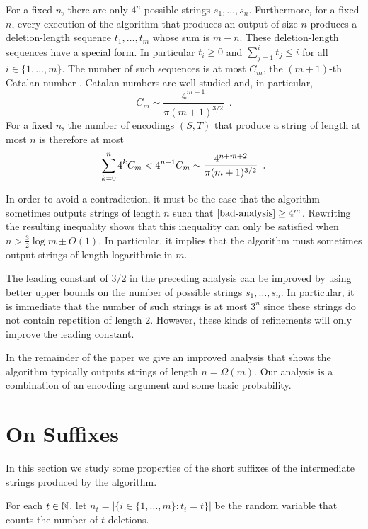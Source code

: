 \documentclass{patmorin}
\begin{document}
For a fixed $n$, there are only $4^n$ possible strings $s_1,\ldots,s_n$.  Furthermore, for a fixed $n$, every execution of the algorithm that produces an output of size $n$ produces a deletion-length sequence $t_1,\ldots,t_m$ whose sum is $m-n$.  These deletion-length sequences have a special form. In particular $t_i\ge 0$ and $\sum_{j=1}^i t_j\le i$ for all $i\in\{1,\ldots,m\}$. The number of such sequences is at most $C_{m}$, the $(m+1)$-th Catalan number \cite{X}.  Catalan numbers are well-studied and, in particular,
\[
     C_m \sim \frac{4^{m+1}}{\pi(m+1)^{3/2}} \enspace .
\]
For a fixed $n$, the number of encodings $(S,T)$ that produce a string of length at most $n$ is therefore at most
\begin{equation}
     \sum_{k=0}^n 4^k C_m < 4^{n+1} C_m \sim \frac{4^{n+m+2}}{\pi(m+1)^{3/2}} \enspace . \eqlabel{bad-analysis}
\end{equation}

In order to avoid a contradiction, it must be the case that the algorithm sometimes outputs strings of length $n$ such that $\eqref{bad-analysis} \ge 4^m$.  Rewriting the resulting inequality shows that this inequality can only be satisfied when $n > \tfrac{3}{2}\log m \pm O(1)$.  In particular, it implies that the algorithm must sometimes output strings of length logarithmic in $m$.

The leading constant of $3/2$ in the preceding analysis can be improved by using better upper bounds on the number of possible strings $s_1,\ldots,s_n$. In particular, it is immediate that the number of such strings is at most $3^{n}$ since these strings do not contain repetition of length 2.  However, these kinds of refinements will only improve the leading constant.

In the remainder of the paper we give an improved analysis that shows the algorithm typically outputs strings of length $n=\Omega(m)$.  Our analysis is a combination of an encoding argument and some basic probability.

\section{On Suffixes}

In this section we study some properties of the short suffixes of the intermediate strings produced by the algorithm.  

For each $t\in\mathbb{N}$, let $n_t=|\{i\in\{1,\ldots,m\}: t_i=t\}|$ be the random variable that counts the number of $t$-deletions.
\end{document}
